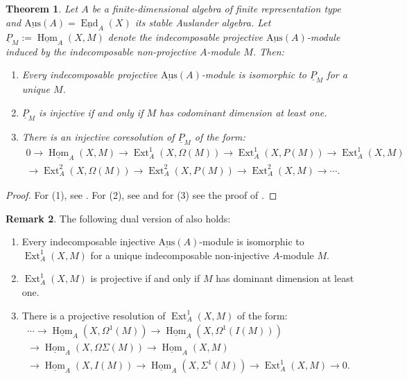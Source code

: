 \documentclass[a4paper]{amsart}
\newtheorem{theorem}{Theorem}[section]
\theoremstyle{definition}
\newtheorem{remark}[theorem]{Remark}
\theoremstyle{remark}
\numberwithin{equation}{theorem}
\newcommand{\Ext}{\operatorname{Ext}}
\newcommand{\End}{\operatorname{End}}
\newcommand{\Hom}{\operatorname{Hom}}
\newcommand{\sAus}{\operatorname{\underline{Aus}}}
\newcommand{\pstab}[1]{\underline{P}_{#1}}
\begin{document}
\begin{theorem} \label{theoreminjcoresstableaus}
Let $ A $ be a finite-dimensional algebra of finite representation type and $\sAus(A) = \underline{\End}_A(X)$ its stable Auslander algebra. Let $\pstab M := \underline{\Hom}_A(X,M)$ denote the indecomposable projective $\sAus(A)$-module induced by the indecomposable non-projective $A$-module $M$. Then:
\begin{enumerate}
    \item \label{theoreminjcoresstableaus1}Every indecomposable projective $\sAus(A)$-module is isomorphic to $\pstab M$ for a unique $M$.
    \item \label{theoreminjcoresstableaus2}$\pstab M$ is injective if and only if $M$ has codominant dimension at least one.
    \item \label{theoreminjcoresstableaus3}There is an injective coresolution of $\pstab M$ of the form:
    \begin{align*}
        0 \rightarrow \underline{\Hom}_A(X,M) \rightarrow \Ext_A^1(X,\Omega(M)) \rightarrow \Ext_A^1(X,P(M)) \rightarrow \Ext_A^1(X,M)\\
        \rightarrow \Ext_A^2(X,\Omega(M)) \rightarrow \Ext_A^2(X,P(M)) \rightarrow \Ext_A^2(X,M) \rightarrow \cdots.
    \end{align*}


\end{enumerate}
\end{theorem}
\begin{proof}
For (1), see \cite[Proposition I.3.3]{AR}.
For (2), see \cite[Proposition II.1.2]{AR} and for (3) see the proof of \cite[Proposition I.3.2]{AR}.
\end{proof}

\begin{remark} \label{injresremark}
    The following dual version of  also holds:
    \begin{enumerate}
        \item\label{rem:injective.sAus} Every indecomposable injective $\sAus(A)$-module is isomorphic to $\Ext_A^1(X,M)$ for a unique indecomposable non-injective $A$-module $M$.
        \item $\Ext_A^1(X,M)$ is projective if and only if $M$ has dominant dimension at least one.
        \item There is a projective resolution of $ \Ext_A^1(X,M)$ of the form:
        \begin{multline*}
            \cdots \to \underline{\Hom}_A(X,\Omega^{1}(M))
            \to \underline{\Hom}_A(X,\Omega^{1}(I(M)))  \\
            \to \underline{\Hom}_A(X,\Omega \Sigma(M))
            \to \underline{\Hom}_A(X,M) \\
            \to \underline{\Hom}_A(X,I(M))
            \to \underline{\Hom}_A(X,\Sigma^1(M))
            \to \Ext_A^1(X,M)
            \to 0.
        \end{multline*}
    \end{enumerate}
\end{remark}
\end{document}
